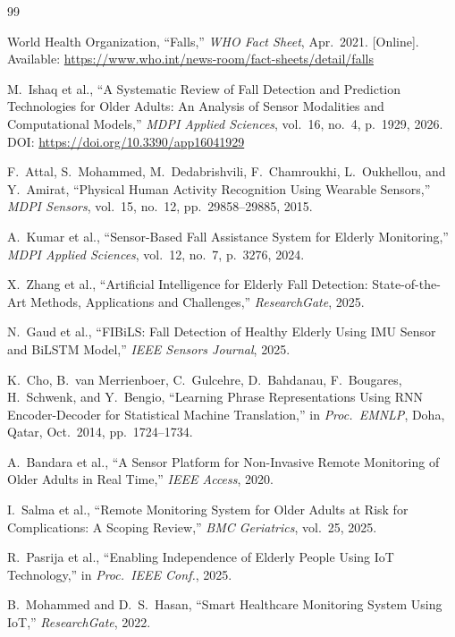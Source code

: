 \documentclass[conference]{IEEEtran}
\begin{document}
\begin{thebibliography}{99}

World Health Organization, ``Falls,'' \textit{WHO Fact Sheet}, Apr.\ 2021.
[Online]. Available: \url{https://www.who.int/news-room/fact-sheets/detail/falls}

M.~Ishaq et al., ``A Systematic Review of Fall Detection and Prediction
Technologies for Older Adults: An Analysis of Sensor Modalities and
Computational Models,'' \textit{MDPI Applied Sciences}, vol.~16, no.~4,
p.~1929, 2026. DOI: \url{https://doi.org/10.3390/app16041929}

F.~Attal, S.~Mohammed, M.~Dedabrishvili, F.~Chamroukhi, L.~Oukhellou, and
Y.~Amirat, ``Physical Human Activity Recognition Using Wearable Sensors,''
\textit{MDPI Sensors}, vol.~15, no.~12, pp.~29858--29885, 2015.

A.~Kumar et al., ``Sensor-Based Fall Assistance System for Elderly
Monitoring,'' \textit{MDPI Applied Sciences}, vol.~12, no.~7, p.~3276,
2024.

X.~Zhang et al., ``Artificial Intelligence for Elderly Fall Detection:
State-of-the-Art Methods, Applications and Challenges,'' \textit{ResearchGate},
2025.

N.~Gaud et al., ``FIBiLS: Fall Detection of Healthy Elderly Using IMU
Sensor and BiLSTM Model,'' \textit{IEEE Sensors Journal}, 2025.

K.~Cho, B.~van Merrienboer, C.~Gulcehre, D.~Bahdanau, F.~Bougares,
H.~Schwenk, and Y.~Bengio, ``Learning Phrase Representations Using RNN
Encoder-Decoder for Statistical Machine Translation,'' in \textit{Proc.\
EMNLP}, Doha, Qatar, Oct.~2014, pp.~1724--1734.

A.~Bandara et al., ``A Sensor Platform for Non-Invasive Remote Monitoring
of Older Adults in Real Time,'' \textit{IEEE Access}, 2020.

I.~Salma et al., ``Remote Monitoring System for Older Adults at Risk for
Complications: A Scoping Review,'' \textit{BMC Geriatrics}, vol.~25, 2025.

R.~Pasrija et al., ``Enabling Independence of Elderly People Using IoT
Technology,'' in \textit{Proc.\ IEEE Conf.}, 2025.

B.~Mohammed and D.~S.~Hasan, ``Smart Healthcare Monitoring System Using
IoT,'' \textit{ResearchGate}, 2022.


\end{thebibliography}
\end{document}
